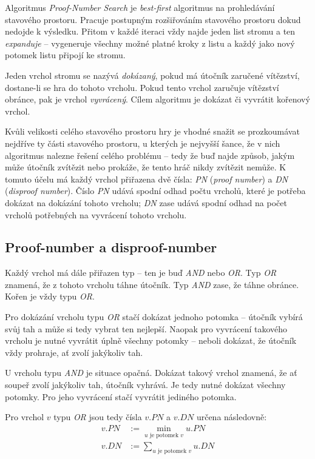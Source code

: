 \documentclass{article}
\begin{document}
Algoritmus \emph{Proof-Number Search} je \emph{best-first} algoritmus na
prohledávání stavového prostoru. Pracuje postupným rozšiřováním stavového 
prostoru dokud nedojde k výsledku. Přitom v každé iteraci vždy najde jeden list 
stromu a ten \emph{expanduje} -- vygeneruje všechny možné platné kroky z listu 
a každý jako nový potomek listu připojí ke stromu.

Jeden vrchol stromu se nazývá \emph{dokázaný}, pokud má útočník zaručené 
vítězství, dostane-li se hra do tohoto vrcholu. Pokud tento vrchol zaručuje 
vítězství obránce, pak je vrchol \emph{vyvrácený}. Cílem algoritmu je dokázat či
vyvrátit kořenový vrchol.

Kvůli velikosti celého stavového prostoru hry je vhodné snažit se prozkoumávat
nejdříve ty části stavového prostoru, u kterých je nejvyšší šance, že v nich 
algoritmus nalezne řešení celého problému -- tedy že buď najde způsob, jakým může
útočník zvítězit nebo prokáže, že tento hráč nikdy zvítězit nemůže. K tomuto
účelu má každý vrchol přiřazena dvě čísla: \emph{PN} (\emph{proof number}) a 
\emph{DN} (\emph{disproof number}). Číslo \emph{PN} udává spodní odhad počtu
vrcholů, které je potřeba dokázat na dokázání tohoto vrcholu; \emph{DN} zase
udává spodní odhad na počet vrcholů potřebných na vyvrácení tohoto vrcholu.

\subsection{Proof-number a disproof-number}
Každý vrchol má dále přiřazen typ -- ten je buď \emph{AND} nebo \emph{OR}. Typ
\emph{OR} znamená, že z tohoto vrcholu táhne útočník. Typ \emph{AND} zase, že 
táhne obránce. Kořen je vždy typu \emph{OR}.

Pro dokázání vrcholu typu \emph{OR} stačí dokázat jednoho potomka -- útočník
vybírá svůj tah a může si tedy vybrat ten nejlepší. Naopak pro vyvrácení takového 
vrcholu je nutné vyvrátit úplně všechny potomky -- neboli dokázat, že útočník 
vždy prohraje, ať zvolí jakýkoliv tah.

U vrcholu typu \emph{AND} je situace opačná. Dokázat takový vrchol znamená, že
ať soupeř zvolí jakýkoliv tah, útočník vyhrává. Je tedy nutné dokázat všechny 
potomky. Pro jeho vyvrácení stačí vyvrátit jediného potomka.

Pro vrchol $v$ typu \emph{OR} jsou tedy čísla $v.PN$ a $v.DN$ určena následovně:
\begin{align*}
  v.PN &:= \min_{u \text{ je potomek $v$}} u.PN \\
  v.DN &:= \sum_{u \text{ je potomek $v$}} u.DN
\end{align*}
\end{document}
